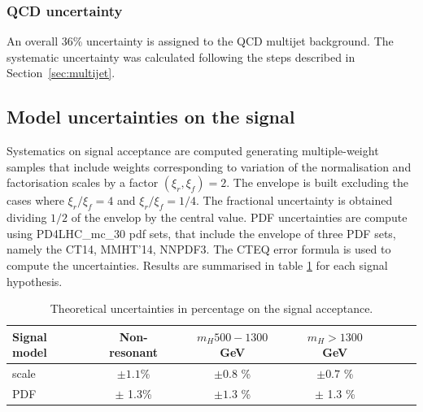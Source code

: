 \subsubsection{QCD uncertainty}
An overall 36\% uncertainty is assigned to the QCD multijet background. The systematic uncertainty was calculated following the steps described in Section~\ref{sec:multijet}. 


\subsection{Model uncertainties on the signal}

Systematics on signal acceptance are computed generating
multiple-weight samples that include weights corresponding to
variation of the normalisation and factorisation scales by a factor
$(\xi_r, \xi_f)= 2$. The envelope is built excluding the cases where
$\xi_r/\xi_f = 4$ and $\xi_r/\xi_f = 1/4$. The fractional uncertainty
is obtained dividing $1/2$ of the envelop by the central value.
PDF uncertainties are compute using PD4LHC\_mc\_30 pdf sets, that
include the envelope of three PDF sets, namely the CT14, MMHT'14,
NNPDF3. The CTEQ error formula is used to compute the uncertainties.
Results are summarised in table \ref{tab:sig_systs} for each signal
hypothesis.

\begin{table}
\centering
\begin{tabular}{l|cc|cc|cc}
\hline
Signal model               & Non-resonant 	& $m_H 500 -1300$ GeV & $m_H > 1300$ GeV    \\\hline 
\hline
scale & $\pm 1.1$\% & $\pm 0.8$ \% & $\pm 0.7$ \% \\
PDF & $\pm$ 1.3\% & $\pm 1.3$ \% & $\pm$ 1.3 \% \\
\hline
\end{tabular}
\caption{Theoretical uncertainties in percentage on the signal acceptance.}

\label{tab:sig_systs}
\end{table}

